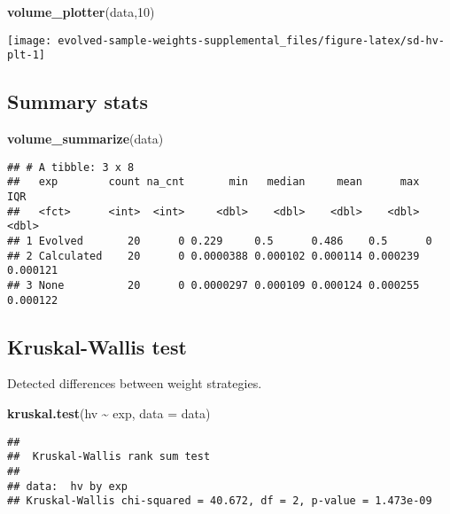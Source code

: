 \documentclass[
]{book}
\newenvironment{Shaded}{\begin{snugshade}}{\end{snugshade}}
\newcommand{\AttributeTok}[1]{\textcolor[rgb]{0.13,0.29,0.53}{#1}}
\newcommand{\DecValTok}[1]{\textcolor[rgb]{0.00,0.00,0.81}{#1}}
\newcommand{\FunctionTok}[1]{\textcolor[rgb]{0.13,0.29,0.53}{\textbf{#1}}}
\newcommand{\NormalTok}[1]{#1}
\newcommand{\SpecialCharTok}[1]{\textcolor[rgb]{0.81,0.36,0.00}{\textbf{#1}}}
\begin{document}
\begin{Shaded}
\begin{Highlighting}[]
\FunctionTok{volume\_plotter}\NormalTok{(data,}\DecValTok{10}\NormalTok{)}
\end{Highlighting}
\end{Shaded}

\texttt{[image: evolved-sample-weights-supplemental\_files/figure-latex/sd-hv-plt-1]}

\hypertarget{summary-stats-9}{%
\subsection{Summary stats}\label{summary-stats-9}}

\begin{Shaded}
\begin{Highlighting}[]
\FunctionTok{volume\_summarize}\NormalTok{(data)}
\end{Highlighting}
\end{Shaded}

\begin{verbatim}
## # A tibble: 3 x 8
##   exp        count na_cnt       min   median     mean      max      IQR
##   <fct>      <int>  <int>     <dbl>    <dbl>    <dbl>    <dbl>    <dbl>
## 1 Evolved       20      0 0.229     0.5      0.486    0.5      0       
## 2 Calculated    20      0 0.0000388 0.000102 0.000114 0.000239 0.000121
## 3 None          20      0 0.0000297 0.000109 0.000124 0.000255 0.000122
\end{verbatim}

\hypertarget{kruskal-wallis-test-9}{%
\subsection{Kruskal-Wallis test}\label{kruskal-wallis-test-9}}

Detected differences between weight strategies.

\begin{Shaded}
\begin{Highlighting}[]
\FunctionTok{kruskal.test}\NormalTok{(hv }\SpecialCharTok{\textasciitilde{}}\NormalTok{ exp, }\AttributeTok{data =}\NormalTok{ data)}
\end{Highlighting}
\end{Shaded}

\begin{verbatim}
## 
##  Kruskal-Wallis rank sum test
## 
## data:  hv by exp
## Kruskal-Wallis chi-squared = 40.672, df = 2, p-value = 1.473e-09
\end{verbatim}
\end{document}
